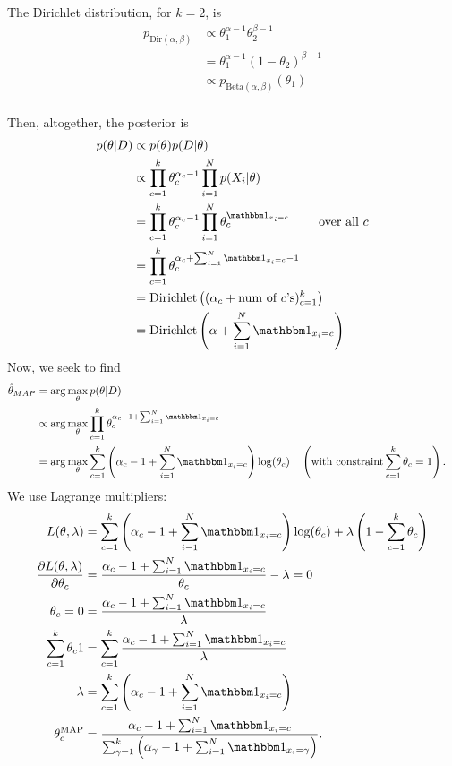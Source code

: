 \documentclass{chaistyle}
\begin{document}
\begin{example*}
    The Dirichlet distribution, for \(k=2\), is \begin{align*}
        p_{\text{Dir}(\alpha,\beta)}&\propto \theta_1^{\alpha-1}\theta_2^{\beta-1} \\
        &= \theta_1^{\alpha-1}(1-\theta_2)^{\beta-1} \\
        &\propto p_{\text{Beta}(\alpha,\beta)}(\theta_1) \\
    \end{align*}
\end{example*}
Then, altogether, the posterior is \begin{align*}
    p(\theta|D)&\propto p(\theta)p(D|\theta) \\
    &\propto \prod_{c=1}^{k} \theta_c^{\alpha_c-1}\prod_{i=1}^{N}p(X_i|\theta) \\
    &= \prod_{c=1}^{k} \theta_c^{\alpha_c-1}\prod_{i=1}^{N}\theta_c^{\indic_{x_i=c}}\qquad\text{ over all \(c\)} \\
    &= \prod_{c=1}^{k} \theta_c^{\alpha_c+\sum_{i=1}^{N}\indic_{x_i=c}-1} \\ 
    &= \text{Dirichlet}\left((\alpha_c+\text{num of \(c\)'s})_{c=1}^k\right) \\ 
    &= \text{Dirichlet}\left(\alpha+\sum_{i=1}^{N}\indic_{x_i=c}\right) \\
\end{align*}
Now, we seek to find \begin{align*}
    \hat\theta_{MAP}&=\arg\max_{\theta}p(\theta|D) \\
    &\propto \arg\max_{\theta}\prod_{c=1}^{k} \theta_c^{\alpha_c-1+\sum_{i=1}^{N}\indic_{x_i=c}} \\
    &= \arg\max_{\theta}\sum_{c=1}^{k}\left(\alpha_c-1+\sum_{i=1}^{N}\indic_{x_i=c}\right)\log(\theta_c) &&\left(\text{with constraint}\sum_{c=1}^{k} \theta_c=1\right).
\end{align*}
We use Lagrange multipliers: \begin{align*}
    L(\theta,\lambda) &= \sum_{c=1}^{k} \left(\alpha_c-1+\sum_{i-1}^{N} \indic_{x_i=c}\right)\log(\theta_c)+\lambda\left(1-\sum_{c=1}^{k}\theta_c\right) \\
    \frac{\del L(\theta,\lambda)}{\del \theta_c} &= \frac{\alpha_c-1+\sum_{i=1}^{N}\indic_{x_i=c}}{\theta_c}-\lambda = 0 \\ 
    \theta_c = 0 &= \frac{\alpha_c-1+\sum_{i=1}^{N}\indic_{x_i=c}}{\lambda} \\
    \sum_{c=1}^{k}\theta_c 1 &= \sum_{c=1}^{k} \frac{\alpha_c-1+\sum_{i=1}^{N} \indic_{x_i=c}}{\lambda} \\
    \lambda &= \sum_{c=1}^{k} \left(\alpha_c-1+\sum_{i=1}^{N}\indic_{x_i=c}\right) \\
    \theta_c^\text{MAP} &= \frac{\alpha_c-1+\sum_{i=1}^{N}\indic_{x_i=c}}{\sum_{\gamma=1}^{k} \left(\alpha_\gamma-1+\sum_{i=1}^{N}\indic_{x_i=\gamma}\right)}.
\end{align*}
\end{document}
